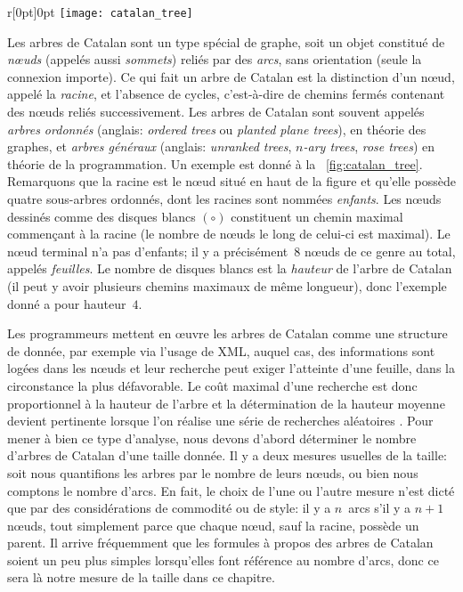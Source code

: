 %
\begin{wrapfigure}[9]{r}[0pt]{0pt}
\centering
\texttt{[image: catalan\_tree]}
\caption{Arbre de Catalan de hauteur~4}
\label{fig:catalan_tree}
\end{wrapfigure}
Les arbres de Catalan sont un type spécial de graphe, soit un objet
constitué de \emph{nœuds} (appelés aussi \emph{sommets}) reliés
par des \emph{arcs}, sans orientation (seule la connexion importe). Ce
qui fait un arbre de Catalan est la distinction d'un nœud, appelé
la \emph{racine}, et l'absence de cycles, c'est-à-dire de chemins
fermés contenant des nœuds reliés successivement. Les arbres de
Catalan sont souvent appelés \emph{arbres ordonnés} (anglais:
\emph{ordered trees} ou \emph{planted plane trees}), en théorie des
graphes, et \emph{arbres généraux} (anglais: \emph{unranked trees},
\emph{\(n\)-ary trees}, \emph{rose trees}) en théorie de la
programmation. Un exemple est donné à la
\fig~\ref{fig:catalan_tree}. Remarquons que la racine est le nœud
situé en haut de la figure et qu'elle possède quatre sous-arbres
ordonnés, dont les racines sont nommées \emph{enfants}. Les nœuds
dessinés comme des disques blancs \((\circ)\) constituent un chemin
maximal commençant à la racine (le nombre de nœuds le long de
celui-ci est maximal). Le nœud terminal n'a pas d'enfants; il y a
précisément~\(8\) nœuds de ce genre au total, appelés
\emph{feuilles}. Le nombre de disques blancs est la \emph{hauteur} de
l'arbre de Catalan (il peut y avoir plusieurs chemins maximaux de même
longueur), donc l'exemple donné a pour hauteur~\(4\).

Les programmeurs mettent en œuvre les arbres de Catalan comme une
structure de donnée, par exemple via l'usage de \textsf{XML}, auquel
cas, des informations sont logées dans les nœuds et leur recherche
peut exiger l'atteinte d'une feuille, dans la circonstance la plus
défavorable. Le coût maximal d'une recherche est donc proportionnel à
la hauteur de l'arbre et la détermination de la hauteur moyenne
devient pertinente lorsque l'on réalise une série de recherches
aléatoires \citep{VitterFlajolet_1990}. Pour mener à bien ce type
d'analyse, nous devons d'abord déterminer le nombre d'arbres de
Catalan d'une taille donnée. Il y a deux mesures usuelles de la
taille: soit nous quantifions les arbres par le nombre de leurs
nœuds, ou bien nous comptons le nombre d'arcs. En fait, le choix
de l'une ou l'autre mesure n'est dicté que par des considérations de commodité ou de style: il y a \(n\)~arcs s'il y a \(n+1\) nœuds, tout simplement parce que chaque nœud, sauf la racine, possède un parent. Il arrive fréquemment que les formules à propos des arbres de Catalan soient un peu plus simples lorsqu'elles font référence au nombre d'arcs, donc ce sera là notre mesure de la taille dans ce chapitre.

